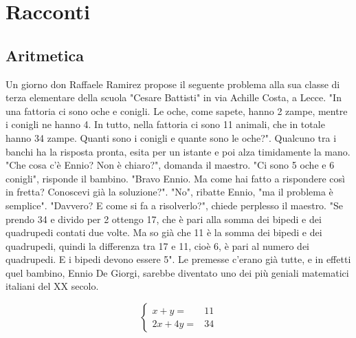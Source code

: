 \chapter{Racconti}
\section{Aritmetica}
\begin{racconto}[De Giorgi]
Un giorno don Raffaele Ramirez propose il seguente problema alla sua classe di terza elementare della scuola "Cesare Battisti" in via Achille Costa, a Lecce.
"In una fattoria ci sono oche e conigli.
Le oche, come sapete, hanno 2 zampe, mentre i conigli ne hanno 4.
In tutto, nella fattoria ci sono 11 animali, che in totale hanno 34 zampe.
Quanti sono i conigli e quante sono le oche?".
Qualcuno tra i banchi ha la risposta pronta, esita per un istante e poi alza timidamente la mano.
"Che cosa c'è Ennio? Non è chiaro?", domanda il maestro.
"Ci sono 5 oche e 6 conigli", risponde il bambino.
"Bravo Ennio. 
Ma come hai fatto a rispondere così in fretta?
Conoscevi già la soluzione?".
"No", ribatte Ennio, "ma il problema è semplice".
"Davvero? E come si fa a risolverlo?", chiede perplesso il maestro.
"Se prendo 34 e divido per 2 ottengo 17, che è pari alla somma dei bipedi e dei quadrupedi contati due volte.
Ma so già che 11 è la somma dei bipedi e dei quadrupedi, quindi la differenza tra 17 e 11, cioè 6, è pari al numero dei quadrupedi.
E i bipedi devono essere 5".
Le premesse c'erano già tutte, e in effetti quel bambino, Ennio De Giorgi, sarebbe diventato uno dei più geniali matematici italiani del XX secolo.
\end{racconto}
\[
\left \{\begin{array}{ll}
x+y=&11\\
2x+4y=&34
\end{array}
\right.
\]